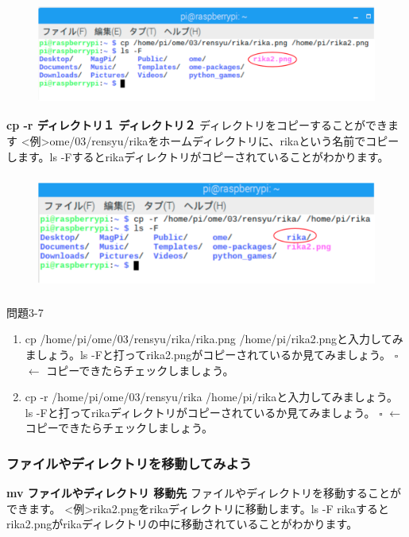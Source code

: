 \documentclass[a4paper,dvipdfmx]{jarticle}
\begin{document}
\begin{figure}
\centering
\includegraphics[width=17.133cm,height=3.304cm]{text03-img/text03-img016.png}
\end{figure}
\textbf{cp {}-r ディレクトリ１
ディレクトリ２}\newline
ディレクトリをコピーすることができます\newline
{\textless}例{\textgreater}ome/03/rensyu/rikaをホームディレクトリに、rikaという名前でコピーします。ls
{}-Fするとrikaディレクトリがコピーされていることがわかります。\newline


\begin{figure}
\centering
\includegraphics[width=17.618cm,height=3.81cm]{text03-img/text03-img017.png}
\end{figure}
{\ttfamily
問題3-7}

\begin{enumerate}
\item cp /home/pi/ome/03/rensyu/rika/rika.png
/home/pi/rika2.pngと入力してみましょう。ls
{}-Fと打ってrika2.pngがコピーされているか見てみましょう。\newline
${\square}$ $\leftarrow $
コピーできたらチェックしましょう。
\item cp {}-r /home/pi/ome/03/rensyu/rika
/home/pi/rikaと入力してみましょう。\newline
ls
{}-Fと打ってrikaディレクトリがコピーされているか見てみましょう。\newline
${\square}$ $\leftarrow $
コピーできたらチェックしましょう。
\end{enumerate}
\subsubsection{}
\clearpage\subsubsection{ファイルやディレクトリを移動してみよう}
\textbf{mv ファイルやディレクトリ 移動先}\newline
ファイルやディレクトリを移動することができます。\newline
{\textless}例{\textgreater}rika2.pngをrikaディレクトリに移動します。ls
{}-F
rikaするとrika2.pngがrikaディレクトリの中に移動されていることがわかります。
\end{document}
